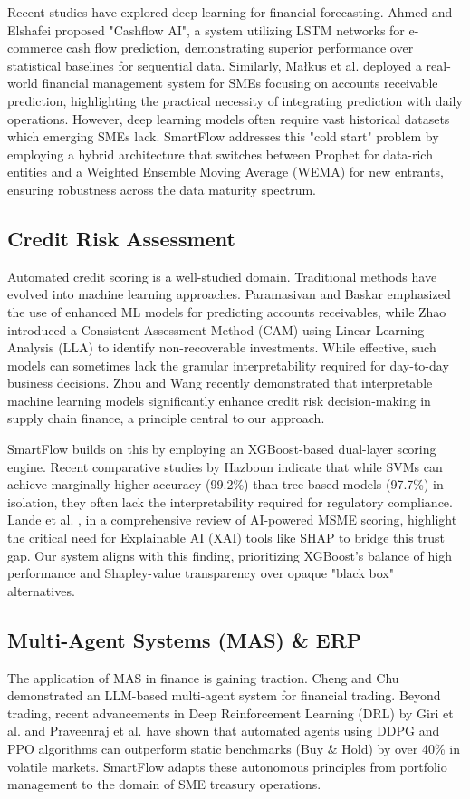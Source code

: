 \documentclass[conference]{IEEEtran}
\begin{document}
Recent studies have explored deep learning for financial forecasting. Ahmed and Elshafei \cite{ahmed2025} proposed "Cashflow AI", a system utilizing LSTM networks for e-commerce cash flow prediction, demonstrating superior performance over statistical baselines for sequential data. Similarly, Małkus et al. \cite{malkus2025} deployed a real-world financial management system for SMEs focusing on accounts receivable prediction, highlighting the practical necessity of integrating prediction with daily operations. However, deep learning models often require vast historical datasets which emerging SMEs lack. SmartFlow addresses this "cold start" problem by employing a hybrid architecture that switches between Prophet for data-rich entities and a Weighted Ensemble Moving Average (WEMA) for new entrants, ensuring robustness across the data maturity spectrum.

\subsection{Credit Risk Assessment}
Automated credit scoring is a well-studied domain. Traditional methods have evolved into machine learning approaches. Paramasivan and Baskar \cite{paramasivan2025} emphasized the use of enhanced ML models for predicting accounts receivables, while Zhao \cite{zhao2024} introduced a Consistent Assessment Method (CAM) using Linear Learning Analysis (LLA) to identify non-recoverable investments. While effective, such models can sometimes lack the granular interpretability required for day-to-day business decisions. Zhou and Wang \cite{zhou2025} recently demonstrated that interpretable machine learning models significantly enhance credit risk decision-making in supply chain finance, a principle central to our approach.

SmartFlow builds on this by employing an XGBoost-based dual-layer scoring engine. Recent comparative studies by Hazboun \cite{hazboun2022} indicate that while SVMs can achieve marginally higher accuracy (99.2\%) than tree-based models (97.7\%) in isolation, they often lack the interpretability required for regulatory compliance. Lande et al. \cite{lande2025}, in a comprehensive review of AI-powered MSME scoring, highlight the critical need for Explainable AI (XAI) tools like SHAP to bridge this trust gap. Our system aligns with this finding, prioritizing XGBoost's balance of high performance and Shapley-value transparency over opaque "black box" alternatives.

\subsection{Multi-Agent Systems (MAS) \& ERP}
The application of MAS in finance is gaining traction. Cheng and Chu \cite{cheng2025} demonstrated an LLM-based multi-agent system for financial trading. Beyond trading, recent advancements in Deep Reinforcement Learning (DRL) by Giri et al. \cite{giri2025} and Praveenraj et al. \cite{praveenraj2025} have shown that automated agents using DDPG and PPO algorithms can outperform static benchmarks (Buy \& Hold) by over 40\% in volatile markets. SmartFlow adapts these autonomous principles from portfolio management to the domain of SME treasury operations.
\end{document}
